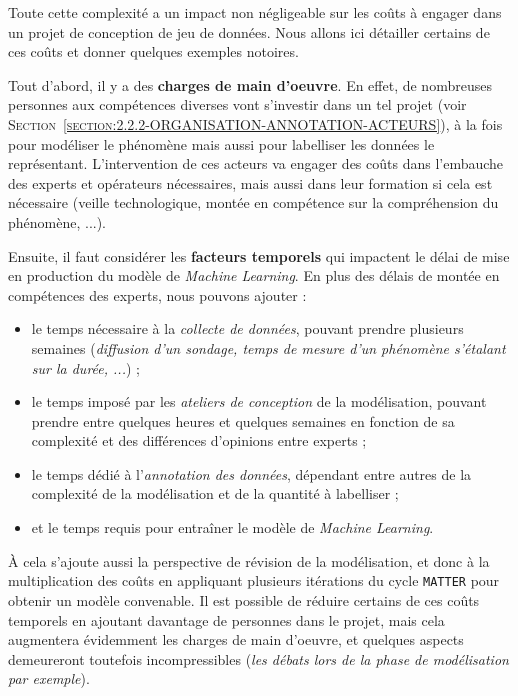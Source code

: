 			Toute cette complexité a un impact non négligeable sur les coûts à engager dans un projet de conception de jeu de données.
			Nous allons ici détailler certains de ces coûts et donner quelques exemples notoires.
			
			Tout d'abord, il y a des \textbf{charges de main d'oeuvre}.
			En effet, de nombreuses personnes aux compétences diverses vont s'investir dans un tel projet (voir \textsc{Section~\ref{section:2.2.2-ORGANISATION-ANNOTATION-ACTEURS}}), à la fois pour modéliser le phénomène mais aussi pour labelliser les données le représentant.
			L'intervention de ces acteurs va engager des coûts dans l'embauche des experts et opérateurs nécessaires, mais aussi dans leur formation si cela est nécessaire (veille technologique, montée en compétence sur la compréhension du phénomène, ...).
			
			Ensuite, il faut considérer les \textbf{facteurs temporels} qui impactent le délai de mise en production du modèle de \textit{Machine Learning}.
			En plus des délais de montée en compétences des experts, nous pouvons ajouter :
			\begin{itemize}
				\item le temps nécessaire à la \textit{collecte de données}, pouvant prendre plusieurs semaines (\textit{diffusion d'un sondage, temps de mesure d'un phénomène s'étalant sur la durée, ...}) ;
				\item le temps imposé par les \textit{ateliers de conception} de la modélisation, pouvant prendre entre quelques heures et quelques semaines en fonction de sa complexité et des différences d'opinions entre experts ;
				\item le temps dédié à l'\textit{annotation des données}, dépendant entre autres de la complexité de la modélisation et de la quantité à labelliser ;
				\item et le temps requis pour entraîner le modèle de \textit{Machine Learning}.
			\end{itemize}
			À cela s'ajoute aussi la perspective de révision de la modélisation, et donc à la multiplication des coûts en appliquant plusieurs itérations du cycle \texttt{MATTER} pour obtenir un modèle convenable.
			Il est possible de réduire certains de ces coûts temporels en ajoutant davantage de personnes dans le projet, mais cela augmentera évidemment les charges de main d'oeuvre, et quelques aspects demeureront toutefois incompressibles (\textit{les débats lors de la phase de modélisation par exemple}).
			
